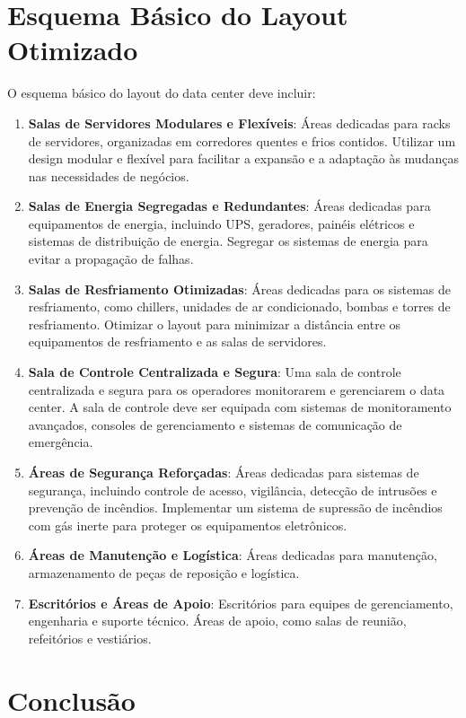 \documentclass[
	12pt,				%
	oneside,			%
	a4paper,			%
	english,			%
	brazil				%
	]{abntex2unama}
\begin{document}
\chapter{Esquema Básico do Layout Otimizado}

O esquema básico do layout do data center deve incluir:

\begin{enumerate}
	\item \textbf{Salas de Servidores Modulares e Flexíveis}: Áreas dedicadas para racks de servidores, organizadas em corredores quentes e frios contidos. Utilizar um design modular e flexível para facilitar a expansão e a adaptação às mudanças nas necessidades de negócios.
	\item \textbf{Salas de Energia Segregadas e Redundantes}: Áreas dedicadas para equipamentos de energia, incluindo UPS, geradores, painéis elétricos e sistemas de distribuição de energia. Segregar os sistemas de energia para evitar a propagação de falhas.
	\item \textbf{Salas de Resfriamento Otimizadas}: Áreas dedicadas para os sistemas de resfriamento, como chillers, unidades de ar condicionado, bombas e torres de resfriamento. Otimizar o layout para minimizar a distância entre os equipamentos de resfriamento e as salas de servidores.
	\item \textbf{Sala de Controle Centralizada e Segura}: Uma sala de controle centralizada e segura para os operadores monitorarem e gerenciarem o data center. A sala de controle deve ser equipada com sistemas de monitoramento avançados, consoles de gerenciamento e sistemas de comunicação de emergência.
	\item \textbf{Áreas de Segurança Reforçadas}: Áreas dedicadas para sistemas de segurança, incluindo controle de acesso, vigilância, detecção de intrusões e prevenção de incêndios. Implementar um sistema de supressão de incêndios com gás inerte para proteger os equipamentos eletrônicos.
	\item \textbf{Áreas de Manutenção e Logística}: Áreas dedicadas para manutenção, armazenamento de peças de reposição e logística.
	\item \textbf{Escritórios e Áreas de Apoio}: Escritórios para equipes de gerenciamento, engenharia e suporte técnico. Áreas de apoio, como salas de reunião, refeitórios e vestiários.
\end{enumerate}

\chapter{Conclusão}
\end{document}
